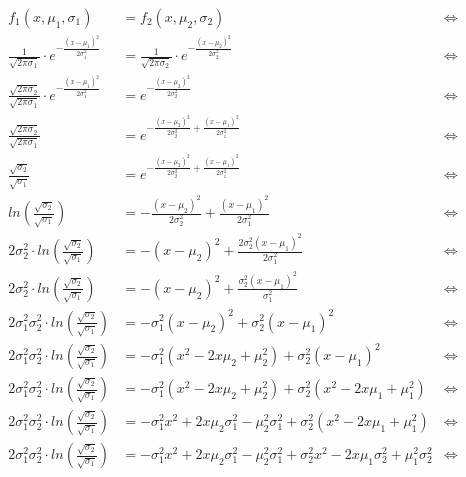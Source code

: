 \documentclass[12pt]{article}
\begin{document}
\begin{align*}
f_1(x,\mu_1,\sigma_1) &= f_2(x,\mu_2,\sigma_2) &\Leftrightarrow\\
\frac{1}{\sqrt{2 \pi \sigma_1}} \cdot e^{-\frac{(x-\mu_1)^2}{2\sigma_1^2}} &= \frac{1}{\sqrt{2 \pi \sigma_2}} \cdot e^{-\frac{(x-\mu_2)^2}{2 \sigma_2^2}} &\Leftrightarrow\\
\frac{\sqrt{2 \pi \sigma_2}}{\sqrt{2 \pi \sigma_1}} \cdot e^{-\frac{(x-\mu_1)^2}{2\sigma_1^2}} &= e^{-\frac{(x-\mu_2)^2}{2 \sigma_2^2}} &\Leftrightarrow\\
\frac{\sqrt{2 \pi \sigma_2}}{\sqrt{2 \pi \sigma_1}} &= e^{-\frac{(x-\mu_2)^2}{2 \sigma_2^2} + {\frac{(x-\mu_1)^2}{2\sigma_1^2}}} &\Leftrightarrow\\
\frac{\sqrt{\sigma_2}}{\sqrt{\sigma_1}} &= e^{-\frac{(x-\mu_2)^2}{2 \sigma_2^2} + {\frac{(x-\mu_1)^2}{2\sigma_1^2}}} &\Leftrightarrow\\
ln \left(\frac{\sqrt{\sigma_2}}{\sqrt{\sigma_1}}\right) &= -\frac{(x-\mu_2)^2}{2 \sigma_2^2} + {\frac{(x-\mu_1)^2}{2\sigma_1^2}} &\Leftrightarrow\\
2 \sigma_2^2 \cdot ln \left(\frac{\sqrt{\sigma_2}}{\sqrt{\sigma_1}}\right) &= -(x-\mu_2)^2 + {\frac{2 \sigma_2^2 (x-\mu_1)^2}{2\sigma_1^2}} &\Leftrightarrow\\
2 \sigma_2^2 \cdot ln \left(\frac{\sqrt{\sigma_2}}{\sqrt{\sigma_1}}\right) &= -(x-\mu_2)^2 + {\frac{\sigma_2^2 (x-\mu_1)^2}{\sigma_1^2}} &\Leftrightarrow\\
2 \sigma_1^2 \sigma_2^2 \cdot ln \left(\frac{\sqrt{\sigma_2}}{\sqrt{\sigma_1}}\right) &= -\sigma_1^2(x-\mu_2)^2 + {\sigma_2^2 (x-\mu_1)^2} &\Leftrightarrow\\
2 \sigma_1^2 \sigma_2^2 \cdot ln \left(\frac{\sqrt{\sigma_2}}{\sqrt{\sigma_1}}\right) &= -\sigma_1^2(x^2 -2x\mu_2 + \mu_2^2) + {\sigma_2^2 (x-\mu_1)^2} &\Leftrightarrow\\
2 \sigma_1^2 \sigma_2^2 \cdot ln \left(\frac{\sqrt{\sigma_2}}{\sqrt{\sigma_1}}\right) &= -\sigma_1^2(x^2 -2x\mu_2 + \mu_2^2) + {\sigma_2^2 (x^2-2x\mu_1+\mu_1^2)} &\Leftrightarrow\\
2 \sigma_1^2 \sigma_2^2 \cdot ln \left(\frac{\sqrt{\sigma_2}}{\sqrt{\sigma_1}}\right) &= -\sigma_1^2x^2 +2x\mu_2\sigma_1^2 - \mu_2^2\sigma_1^2 + \sigma_2^2 (x^2-2x\mu_1+\mu_1^2) &\Leftrightarrow\\
2 \sigma_1^2 \sigma_2^2 \cdot ln \left(\frac{\sqrt{\sigma_2}}{\sqrt{\sigma_1}}\right) &= -\sigma_1^2x^2 +2x\mu_2\sigma_1^2 - \mu_2^2\sigma_1^2 + \sigma_2^2 x^2 -2x\mu_1\sigma_2^2 + \mu_1^2\sigma_2^2 &\Leftrightarrow\\

\end{align*}
\end{document}
